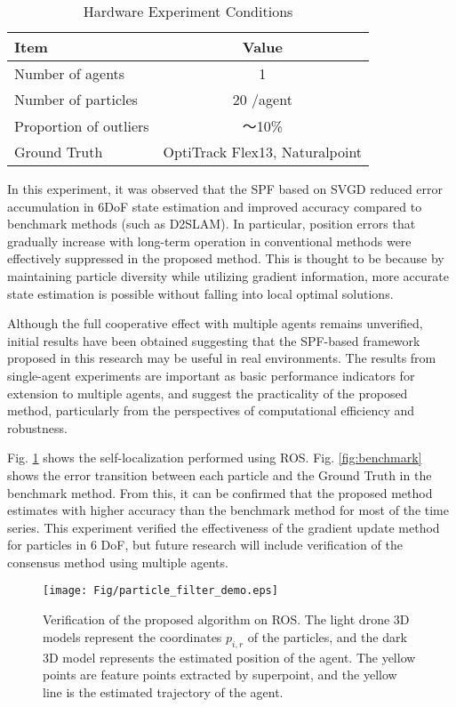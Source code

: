 \documentclass[a4paper,fleqn,10pt,twocolumn]{SICE_ISCS}
\begin{document}
\begin{table}[h]
\caption{Hardware Experiment Conditions}
  \centering
  \begin{tabular}{l|c} \hline
    Item & Value  \\ \hline
    Number of agents & 1  \\
    Number of particles & 20 /agent  \\
    Proportion of outliers & 〜10\% \\
    Ground Truth & OptiTrack Flex13, Naturalpoint \\ \hline
  \end{tabular}
  \label{tb:sim3}
\end{table}

In this experiment, it was observed that the SPF based on SVGD reduced error accumulation in 6DoF state estimation and improved accuracy compared to benchmark methods (such as D2SLAM). In particular, position errors that gradually increase with long-term operation in conventional methods were effectively suppressed in the proposed method. This is thought to be because by maintaining particle diversity while utilizing gradient information, more accurate state estimation is possible without falling into local optimal solutions.

Although the full cooperative effect with multiple agents remains unverified, initial results have been obtained suggesting that the SPF-based framework proposed in this research may be useful in real environments. The results from single-agent experiments are important as basic performance indicators for extension to multiple agents, and suggest the practicality of the proposed method, particularly from the perspectives of computational efficiency and robustness.

Fig. \ref{fig:ros_demo} shows the self-localization performed using ROS.
Fig. \ref{fig:benchmark} shows the error transition between each particle and the Ground Truth in the benchmark method. From this, it can be confirmed that the proposed method estimates with higher accuracy than the benchmark method for most of the time series. This experiment verified the effectiveness of the gradient update method for particles in 6 DoF, but future research will include verification of the consensus method using multiple agents.

\begin{figure}[t]
	\begin{center}
		\texttt{[image: Fig/particle\_filter\_demo.eps]}
		\caption{Verification of the proposed algorithm on ROS. The light drone 3D models represent the coordinates $p_{i,r}$ of the particles, and the dark 3D model represents the estimated position of the agent. The yellow points are feature points extracted by superpoint, and the yellow line is the estimated trajectory of the agent.}
		\label{fig:ros_demo}
	\end{center}
	\vspace{-2mm}
\end{figure}
\end{document}
